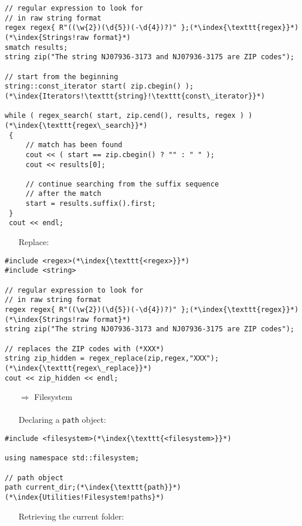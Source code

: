 \documentclass[10pt]{book}
\begin{document}
\begin{lstlisting}
// regular expression to look for
// in raw string format 
regex regex{ R"((\w{2})(\d{5})(-\d{4})?)" };(*\index{\texttt{regex}}*)(*\index{Strings!raw format}*)
smatch results;
string zip("The string NJ07936-3173 and NJ07936-3175 are ZIP codes");

// start from the beginning
string::const_iterator start( zip.cbegin() );(*\index{Iterators!\texttt{string}!\texttt{const\_iterator}}*)

while ( regex_search( start, zip.cend(), results, regex ) )(*\index{\texttt{regex\_search}}*)
 {
     // match has been found
     cout << ( start == zip.cbegin() ? "" : " " );
     cout << results[0];
     
     // continue searching from the suffix sequence
     // after the match
     start = results.suffix().first;
 }
 cout << endl;
\end{lstlisting}
\begin{enumerate}
\item[] Replace:
\end{enumerate}
\begin{lstlisting}
#include <regex>(*\index{\texttt{<regex>}}*)
#include <string>

// regular expression to look for
// in raw string format 
regex regex{ R"((\w{2})(\d{5})(-\d{4})?)" };(*\index{\texttt{regex}}*)(*\index{Strings!raw format}*)
string zip("The string NJ07936-3173 and NJ07936-3175 are ZIP codes");

// replaces the ZIP codes with (*XXX*)
string zip_hidden = regex_replace(zip,regex,"XXX");(*\index{\texttt{regex\_replace}}*)
cout << zip_hidden << endl;
\end{lstlisting}
\begin{enumerate}
\item[$\Rightarrow$] Filesystem\\ \\ Declaring a \texttt{path} object:
\end{enumerate}
\begin{lstlisting}
#include <filesystem>(*\index{\texttt{<filesystem>}}*)

using namespace std::filesystem;

// path object
path current_dir;(*\index{\texttt{path}}*)(*\index{Utilities!Filesystem!paths}*)
\end{lstlisting}
\begin{enumerate}
\item[] Retrieving the current folder:
\end{enumerate}
\end{document}
